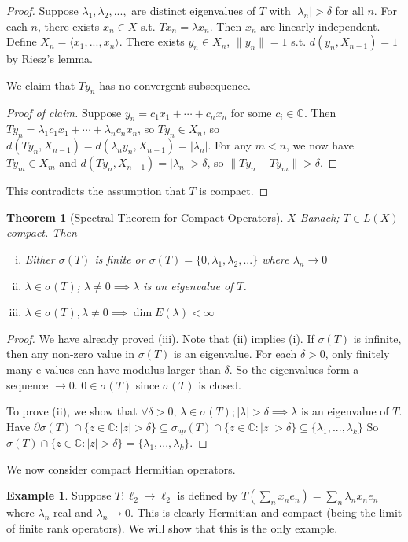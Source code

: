 \documentclass{article}
\theoremstyle{definition}
\newtheorem{example}[defn]{Example}
\theoremstyle{remark}
\theoremstyle{plain}
\newtheorem{thm}[defn]{Theorem}
\newcommand{\CC}{\mathbb{C}}
\begin{document}
\begin{proof}
    Suppose $\lambda_1,\lambda_2,...,$ are distinct eigenvalues of $T$ with $|\lambda_n|>\delta$ for all $n$. For each $n$, there exists $x_n\in X$ s.t. $Tx_n=\lambda x_n$. Then $x_n$ are linearly independent. Define $X_n=\langle x_1,...,x_n\rangle$. There exists $y_n\in X_n$, $\|y_n\|=1$ s.t. $d(y_n,X_{n-1})=1$ by Riesz's lemma.

    We claim that $Ty_n$ has no convergent subsequence.
    \begin{proof}[Proof of claim]
        Suppose $y_n=c_1x_1+\cdots+c_nx_n$ for some $c_i\in\CC$. Then $Ty_n=\lambda_1c_1x_1+\cdots+\lambda_nc_nx_n$, so $Ty_n\in X_n$, so $d(Ty_n,X_{n-1})=d(\lambda_ny_n,X_{n-1})=|\lambda_n|$. For any $m<n$, we now have $Ty_m\in X_m$ and $d(Ty_n,X_{n-1})=|\lambda_n|>\delta$, so $\|Ty_n-Ty_m\|>\delta$.
    \end{proof}
    This contradicts the assumption that $T$ is compact.
\end{proof}
\begin{thm}[Spectral Theorem for Compact Operators]
    $X$ Banach; $T\in L(X)$ compact. Then
    \begin{enumerate}[(i)]
        \item Either $\sigma(T)$ is finite or $\sigma(T)=\{0,\lambda_1,\lambda_2,...\}$ where $\lambda_n\to 0$
        \item $\lambda\in\sigma(T)$; $\lambda\neq0\implies \lambda$ is an eigenvalue of $T$.
        \item $\lambda\in\sigma(T),\lambda\neq0\implies \dim E(\lambda)<\infty$
    \end{enumerate}
\end{thm}
\begin{proof}
    We have already proved (iii). Note that (ii) implies (i). If $\sigma(T)$ is infinite, then any non-zero value in $\sigma(T)$ is an eigenvalue. For each $\delta>0$, only finitely many e-values can have modulus larger than $\delta$. So the eigenvalues form a sequence $\to0$. $0\in\sigma(T)$ since $\sigma(T)$ is closed.

    To prove (ii), we show that $\forall\delta>0$, $\lambda\in\sigma(T);|\lambda|>\delta\implies\lambda$ is an eigenvalue of $T$. Have $\partial\sigma(T)\cap\{z\in\CC:|z|>\delta\}\subseteq\sigma_{ap}(T)\cap\{z\in\CC:|z|>\delta\}\subseteq\{\lambda_1,...,\lambda_k\}$
    So $\sigma(T)\cap\{z\in\CC:|z|>\delta\}=\{\lambda_1,...,\lambda_k\}$.
\end{proof}
We now consider compact Hermitian operators.
\begin{example}
    Suppose $T:\ell_2\to \ell_2$ is defined by $T(\sum_nx_ne_n)=\sum_n\lambda_nx_ne_n$ where $\lambda_n$ real and $\lambda_n\to0$. This is clearly Hermitian and compact (being the limit of finite rank operators). We will show that this is the only example.
\end{example}
\end{document}
